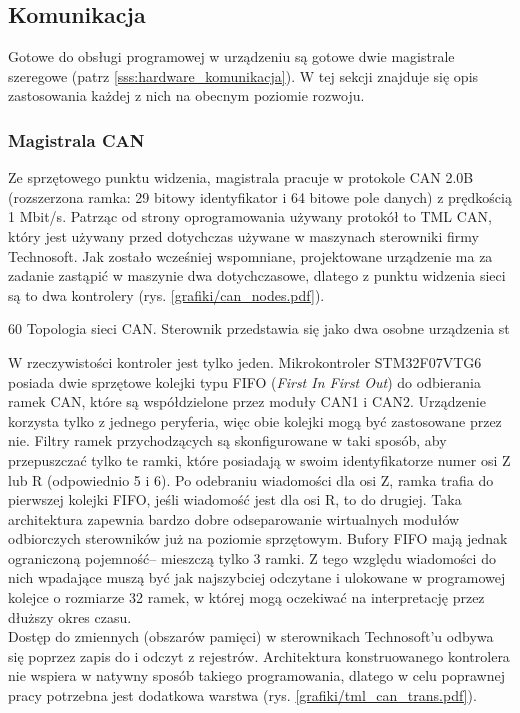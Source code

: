 \subsection{Komunikacja}

Gotowe do obsługi programowej w urządzeniu są gotowe dwie magistrale szeregowe (patrz \ref{sss:hardware_komunikacja}). W tej sekcji znajduje się opis zastosowania każdej z nich na obecnym poziomie rozwoju.

\subsubsection{Magistrala CAN}

Ze sprzętowego punktu widzenia, magistrala pracuje w protokole CAN 2.0B (rozszerzona ramka: 29 bitowy identyfikator i 64 bitowe pole danych) z prędkością 1 Mbit/s. Patrząc od strony oprogramowania używany protokół to TML CAN, który jest używany przed dotychczas używane w maszynach sterowniki firmy Technosoft. Jak zostało wcześniej wspomniane, projektowane urządzenie ma za zadanie zastąpić w maszynie dwa dotychczasowe, dlatego z punktu widzenia sieci są to dwa kontrolery (rys. \ref{grafiki/can_nodes.pdf}).

	{60}
	{Topologia sieci CAN. Sterownik przedstawia się jako dwa osobne urządzenia}
	{st}
	
W rzeczywistości kontroler jest tylko jeden. Mikrokontroler STM32F07VTG6 posiada dwie sprzętowe kolejki typu FIFO ({\it First In First Out}) do odbierania ramek CAN, które są współdzielone przez moduły CAN1 i CAN2. Urządzenie korzysta tylko z jednego peryferia, więc obie kolejki mogą być zastosowane przez nie. Filtry ramek przychodzących są skonfigurowane w taki sposób, aby przepuszczać tylko te ramki, które posiadają w swoim identyfikatorze numer osi Z lub R (odpowiednio 5 i 6). Po odebraniu wiadomości dla osi Z, ramka trafia do pierwszej kolejki FIFO, jeśli wiadomość jest dla osi R, to do drugiej. Taka architektura zapewnia bardzo dobre odseparowanie wirtualnych modułów odbiorczych sterowników już na poziomie sprzętowym. Bufory FIFO mają jednak ograniczoną pojemność-- mieszczą tylko 3 ramki. Z tego względu wiadomości do nich wpadające muszą być jak najszybciej odczytane i ulokowane w programowej kolejce o rozmiarze 32 ramek, w której mogą oczekiwać na interpretację przez dłuższy okres czasu. \\

Dostęp do zmiennych (obszarów pamięci) w sterownikach Technosoft'u odbywa się poprzez zapis do i odczyt z rejestrów. Architektura konstruowanego kontrolera nie wspiera w natywny sposób takiego programowania, dlatego w celu poprawnej pracy potrzebna jest dodatkowa warstwa (rys. \ref{grafiki/tml_can_trans.pdf}).

